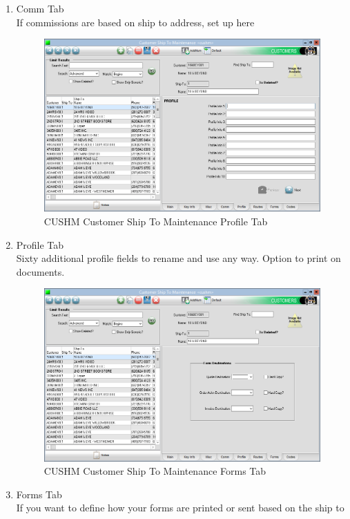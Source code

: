 \begin{enumerate}
	\item Comm Tab\\
	If commissions are based on ship to address, set up here
	
	\begin{figure}[H]
		\includegraphics[width=\textwidth]{../img/image86}
		\caption{CUSHM Customer Ship To Maintenance Profile Tab}
	\end{figure}
	
	\item Profile Tab\\
	Sixty additional profile fields to rename and use any way. Option to print on documents.
	
	\begin{figure}[H]
		\includegraphics[width=\textwidth]{../img/image87}
		\caption{CUSHM Customer Ship To Maintenance Forms Tab}
	\end{figure}
	
	\item Forms Tab\\
	If you want to define how your forms are printed or sent based on the ship to
	

\end{enumerate}
